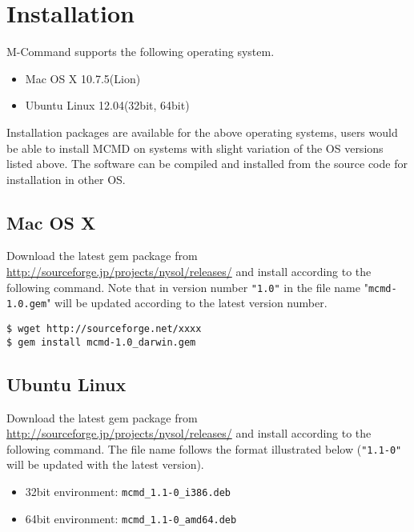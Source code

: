 
%

\section{Installation \label{sect:install}}
M-Command supports the following operating system.
\begin{itemize}
\item Mac OS X 10.7.5(Lion)
\item Ubuntu Linux 12.04(32bit, 64bit)
\end{itemize}

Installation packages are available for the above operating systems, users would be able to install MCMD on systems with slight variation of the OS versions listed above. 
The software can be compiled and installed from the source code for installation in other OS.

\subsection{Mac OS X\label{sect:install_osx}}
Download the latest gem package from \href{http://sourceforge.jp/projects/nysol/releases/}{http://sourceforge.jp/projects/nysol/releases/} and install according to the following command. Note that in version number \verb|"1.0"| in the file name "\verb|mcmd-1.0.gem|" will be updated according to the latest version number.


\begin{Verbatim}[baselinestretch=0.7,frame=single]
$ wget http://sourceforge.net/xxxx
$ gem install mcmd-1.0_darwin.gem
\end{Verbatim}

\subsection{Ubuntu Linux\label{sect:install_ubuntu}}
Download the latest gem package from \href{http://sourceforge.jp/projects/nysol/releases/}{http://sourceforge.jp/projects/nysol/releases/} and install according to the following command. The file name follows the format illustrated below (\verb|"1.1-0"| will be updated with the latest version). 


\begin{itemize}
\item 32bit environment: \verb|mcmd_1.1-0_i386.deb|
\item 64bit environment: \verb|mcmd_1.1-0_amd64.deb|
\end{itemize}

